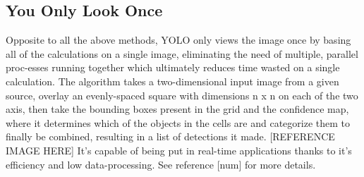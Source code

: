 \subsection{You Only Look Once}
Opposite to all the above methods, YOLO only views the image once by basing all of the calculations on a single image, eliminating the need of multiple, parallel proc-esses running together which ultimately reduces time wasted on a single calculation. The algorithm takes a two-dimensional input image from a given source, overlay an evenly-spaced square with dimensions n x n on each of the two axis, then take the  bounding boxes present in the grid and the confidence map, where it determines which of the objects in the cells are and categorize them to finally be combined, resulting in a list of detections it made. [REFERENCE IMAGE HERE] It's capable of being put in real-time applications thanks to it's efficiency and low data-processing. See reference [num] for more details.